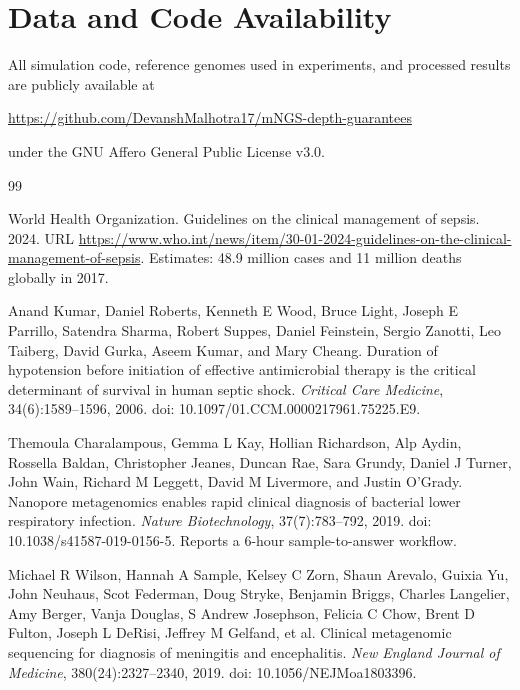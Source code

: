 \documentclass[12pt]{article}
\theoremstyle{definition}
\theoremstyle{plain}
\begin{document}
\section*{Data and Code Availability}

All simulation code, reference genomes used in experiments, and processed
results are publicly available at
\begin{center}
\url{https://github.com/DevanshMalhotra17/mNGS-depth-guarantees}
\end{center}
under the GNU Affero General Public License v3.0.

\begin{thebibliography}{99}
\raggedright

 World Health Organization.
Guidelines on the clinical management of sepsis. 2024. URL
\url{https://www.who.int/news/item/30-01-2024-guidelines-on-the-clinical-management-of-sepsis}.
Estimates: 48.9 million cases and 11 million deaths globally in 2017.

 Anand Kumar, Daniel Roberts, Kenneth E Wood, Bruce Light,
Joseph E Parrillo, Satendra Sharma, Robert Suppes, Daniel Feinstein, Sergio
Zanotti, Leo Taiberg, David Gurka, Aseem Kumar, and Mary Cheang. Duration
of hypotension before initiation of effective antimicrobial therapy is the
critical determinant of survival in human septic shock. \emph{Critical Care
Medicine}, 34(6):1589--1596, 2006. doi: 10.1097/01.CCM.0000217961.75225.E9.

 Themoula Charalampous, Gemma L Kay, Hollian
Richardson, Alp Aydin, Rossella Baldan, Christopher Jeanes, Duncan Rae,
Sara Grundy, Daniel J Turner, John Wain, Richard M Leggett, David M
Livermore, and Justin O'Grady. Nanopore metagenomics enables rapid clinical
diagnosis of bacterial lower respiratory infection. \emph{Nature
Biotechnology}, 37(7):783--792, 2019. doi: 10.1038/s41587-019-0156-5.
Reports a 6-hour sample-to-answer workflow.

 Michael R Wilson, Hannah A Sample, Kelsey C Zorn, Shaun
Arevalo, Guixia Yu, John Neuhaus, Scot Federman, Doug Stryke, Benjamin
Briggs, Charles Langelier, Amy Berger, Vanja Douglas, S Andrew Josephson,
Felicia C Chow, Brent D Fulton, Joseph L DeRisi, Jeffrey M Gelfand, et al.
Clinical metagenomic sequencing for diagnosis of meningitis and
encephalitis. \emph{New England Journal of Medicine}, 380(24):2327--2340,
2019. doi: 10.1056/NEJMoa1803396.


\end{thebibliography}
\end{document}
